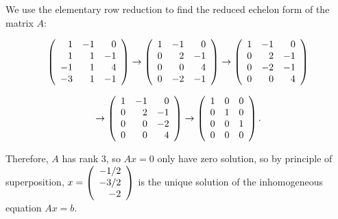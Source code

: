 \documentclass{ximera}
\begin{document}
\begin{exercise}
\begin{solution}
\begin{enumeratea}
\item We use the elementary row reduction to find the reduced echelon form of the matrix $A$:

\[
\left(\begin{array}{rrrrrrrrrrrrrrrrrr} 1 &-1& 0 \\ 1&1&-1 \\ -1&1&4  \\ -3&1&-1  \end{array}\right) \to \left(\begin{array}{rrrrrrrrrrrrrrrrrr} 1 &-1& 0 \\ 0&2&-1 \\ 0&0&4 \\ 0&-2&-1 \end{array}\right) \to
\left(\begin{array}{rrrrrrrrrrrrrrrrrr}  1 &-1& 0\\ 0&2&-1 \\ 0&-2&-1 \\ 0&0&4   \end{array}\right)
\]

\[
\to \left(\begin{array}{rrrrrrrrrrrrrrrrrr} 1 &-1& 0\\ 0&2&-1 \\ 0&0&-2 \\ 0&0&4  \end{array}\right) \to \left(\begin{array}{rrrrrrrrrrrrrrrrrr} 1 &0& 0 \\ 0&1&0 \\ 0&0&1  \\ 0&0&0  \end{array}\right).
\]

Therefore, $A$ has rank 3, so $Ax=0$ only have zero solution, so by principle of superposition,  $x=\left(\begin{array}{rrrrrrrrrrrrrrrrrr} -1/2\\-3/2\\-2 \end{array}\right)$ is the unique solution of the inhomogeneous equation $Ax=b$.

\end{enumeratea}

\end{solution}
\end{exercise}
\end{document}
